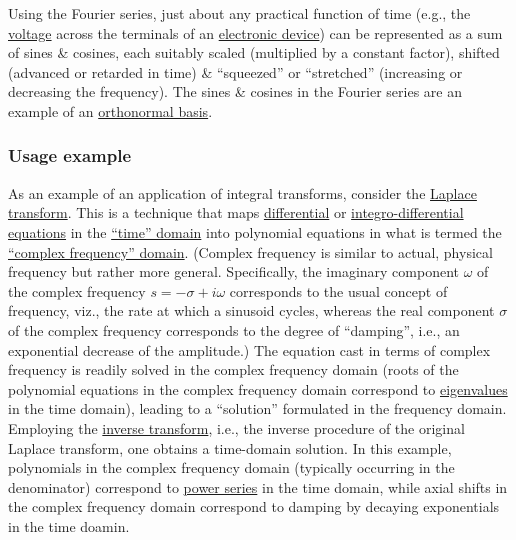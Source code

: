 \documentclass{article}
\begin{document}
Using the Fourier series, just about any practical function of time (e.g., the \href{https://en.wikipedia.org/wiki/Voltage}{voltage} across the terminals of an \href{https://en.wikipedia.org/wiki/Electronic_device}{electronic device}) can be represented as a sum of sines \& cosines, each suitably scaled (multiplied by a constant factor), shifted (advanced or retarded in time) \& ``squeezed'' or ``stretched'' (increasing or decreasing the frequency). The sines \& cosines in the Fourier series are an example of an \href{https://en.wikipedia.org/wiki/Orthonormal_basis}{orthonormal basis}.

\subsubsection{Usage example}
As an example of an application of integral transforms, consider the \href{https://en.wikipedia.org/wiki/Laplace_transform}{Laplace transform}. This is a technique that maps \href{https://en.wikipedia.org/wiki/Differential_equation}{differential} or \href{https://en.wikipedia.org/wiki/Integro-differential_equation}{integro-differential equations} in the \href{https://en.wikipedia.org/wiki/Time_domain}{``time'' domain} into polynomial equations in what is termed the \href{https://en.wikipedia.org/wiki/Frequency_domain}{``complex frequency'' domain}. (Complex frequency is similar to actual, physical frequency but rather more general. Specifically, the imaginary component $\omega$ of the complex frequency $s = -\sigma + i\omega$ corresponds to the usual concept of frequency, viz., the rate at which a sinusoid cycles, whereas the real component $\sigma$ of the complex frequency corresponds to the degree of ``damping'', i.e., an exponential decrease of the amplitude.) The equation cast in terms of complex frequency is readily solved in the complex frequency domain (roots of the polynomial equations in the complex frequency domain correspond to \href{https://en.wikipedia.org/wiki/Eigenvalues}{eigenvalues} in the time domain), leading to a ``solution'' formulated in the frequency domain. Employing the \href{https://en.wikipedia.org/wiki/Inverse_Laplace_transform}{inverse transform}, i.e., the inverse procedure of the original Laplace transform, one obtains a time-domain solution. In this example, polynomials in the complex frequency domain (typically occurring in the denominator) correspond to \href{https://en.wikipedia.org/wiki/Power_series}{power series} in the time domain, while axial shifts in the complex frequency domain correspond to damping by decaying exponentials in the time doamin.
\end{document}

